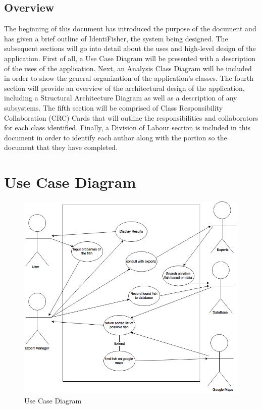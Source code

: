 \documentclass[]{article}
\begin{document}
\subsection{Overview}
\label{sub:overview}
	The beginning of this document has introduced the purpose of the document and has given a brief outline of IdentiFisher, the system being designed. The subsequent sections will go into detail about the uses and high-level design of the application. First of all, a Use Case Diagram will be presented with a description of the uses of the application. Next, an Analysis Class Diagram will be included in order to show the general organization of the application's classes. The fourth section will provide an overview of the architectural design of the application, including a Structural Architecture Diagram as well as a description of any subsystems. The fifth section will be comprised of Class Responsibility Collaboration (CRC) Cards that will outline the responsibilities and collaborators for each class identified. Finally, a Division of Labour section is included in this document in order to identify each author along with the portion so the document that they have completed.


\section{Use Case Diagram}
\label{sec:use_case_diagram}
\begin{figure}
\includegraphics[width=\textwidth]{UseCase}
\caption{Use Case Diagram}
\end{figure}
\end{document}

